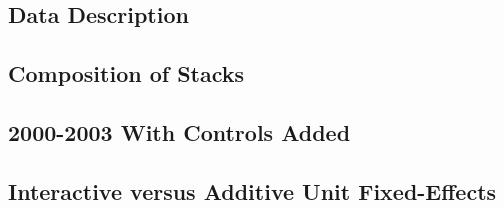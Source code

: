 \documentclass[12pt]{article}
\begin{document}
\newpage

\subsection*{Data Description}



\newpage

\subsection*{Composition of Stacks}



\newpage

\subsection*{2000-2003 With Controls Added}



\newpage

\subsection*{Interactive versus Additive Unit Fixed-Effects}


\end{document}
